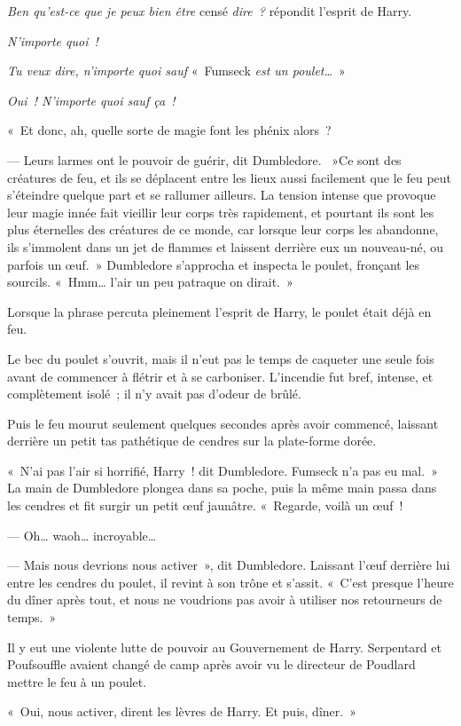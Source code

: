 \emph{Ben qu'est-ce que je peux bien être} censé \emph{dire~?} répondit l'esprit de Harry.

\emph{N'importe quoi~!}

\emph{Tu veux dire, n'importe quoi sauf} «~Fumseck \emph{est un poulet…}~»

\emph{Oui~!
N'importe quoi sauf ça~!}

«~Et donc, ah, quelle sorte de magie font les phénix alors~?

--- Leurs larmes ont le pouvoir de guérir, dit Dumbledore.
~»Ce sont des créatures de feu, et ils se déplacent entre les lieux aussi facilement que le feu peut s'éteindre quelque part et se rallumer ailleurs.
La tension intense que provoque leur magie innée fait vieillir leur corps très rapidement, et pourtant ils sont les plus éternelles des créatures de ce monde, car lorsque leur corps les abandonne, ils s'immolent dans un jet de flammes et laissent derrière eux un nouveau-né, ou parfois un œuf.~»
Dumbledore s'approcha et inspecta le poulet, fronçant les sourcils.
«~Hmm… l'air un peu patraque on dirait.~»

Lorsque la phrase percuta pleinement l'esprit de Harry, le poulet était déjà en feu.

Le bec du poulet s'ouvrit, mais il n'eut pas le temps de caqueter une seule fois avant de commencer à flétrir et à se carboniser.
L'incendie fut bref, intense, et complètement isolé~; il n'y avait pas d'odeur de brûlé.

Puis le feu mourut seulement quelques secondes après avoir commencé, laissant derrière un petit tas pathétique de cendres sur la plate-forme dorée.

«~N'ai pas l'air si horrifié, Harry~! dit Dumbledore.
Fumseck n'a pas eu mal.~»
La main de Dumbledore plongea dans sa poche, puis la même main passa dans les cendres et fit surgir un petit œuf jaunâtre.
«~Regarde, voilà un œuf~!

--- Oh… waoh… incroyable…

--- Mais nous devrions nous activer~», dit Dumbledore.
Laissant l'œuf derrière lui entre les cendres du poulet, il revint à son trône et s'assit.
«~C'est presque l'heure du dîner après tout, et nous ne voudrions pas avoir à utiliser nos retourneurs de temps.~»

Il y eut une violente lutte de pouvoir au Gouvernement de Harry.
Serpentard et Poufsouffle avaient changé de camp après avoir vu le directeur de Poudlard mettre le feu à un poulet.

«~Oui, nous activer, dirent les lèvres de Harry.
Et puis, dîner.~»

